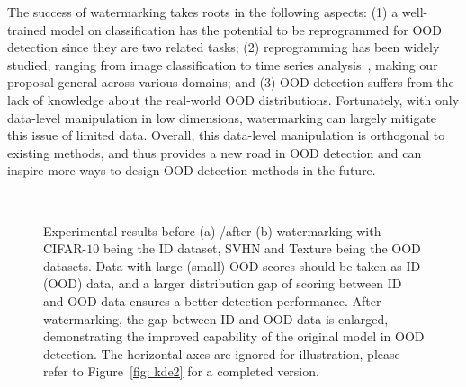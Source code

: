 \documentclass{article}
\begin{document}
The success of watermarking takes roots in the following aspects: (1) a well-trained model on classification has the potential to be reprogrammed for OOD detection since they are two related tasks; (2) reprogramming has been widely studied, ranging from image classification to time series analysis~\cite{deng2009imagenet,TsaiCH20}, making our proposal general across various domains; and (3) OOD detection suffers from the lack of knowledge about the real-world OOD distributions. Fortunately, with only data-level manipulation in low dimensions, watermarking can largely mitigate this issue of limited data. Overall, this data-level manipulation is orthogonal to existing methods, and thus provides a new road in OOD detection and can inspire more ways to design OOD detection methods in the future.

\begin{figure*}[t]
    \centering
    ~~~~~
    \caption{
    Experimental results before (a) /after (b) watermarking with CIFAR-$10$ being the ID dataset, SVHN and Texture being the OOD datasets. Data with large (small) OOD scores should be taken as ID (OOD) data, and a larger distribution gap of scoring between ID and OOD data ensures a better detection performance. After watermarking, the gap between ID and OOD data is enlarged, demonstrating the improved capability of the original model in OOD detection. The horizontal axes are ignored for illustration, please refer to Figure~\ref{fig: kde2} for a completed version.
    }
    \label{fig:kde}
\end{figure*}
\end{document}
